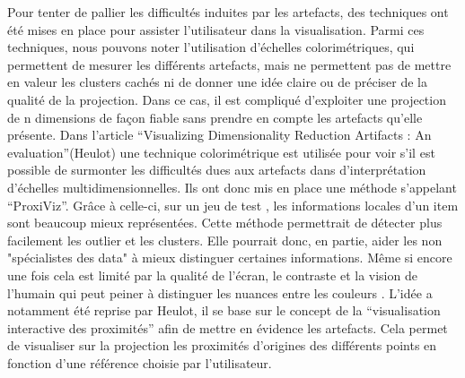 \smallskip
Pour tenter de pallier les difficultés induites par les artefacts, des techniques ont été mises en place pour assister l’utilisateur dans la visualisation. Parmi ces techniques, nous pouvons noter l’utilisation d’échelles colorimétriques\cite{CheckViz}, qui permettent de mesurer les différents artefacts, mais ne permettent pas de mettre en valeur les clusters cachés ni de donner une idée claire ou de préciser de la qualité de la projection. Dans ce cas, il est compliqué d’exploiter une projection de n dimensions de façon fiable sans prendre en compte les artefacts qu’elle présente\cite{aupetit2007visualizing}.    
Dans l’article “Visualizing Dimensionality Reduction Artifacts : An evaluation”(Heulot) une technique colorimétrique est utilisée pour voir s’il est possible de surmonter les difficultés dues aux artefacts dans d’interprétation d’échelles multidimensionnelles. Ils ont donc mis en place une méthode s'appelant “ProxiViz”. Grâce à celle-ci, sur un jeu de test , les informations locales d’un item sont beaucoup mieux représentées. Cette méthode permettrait de détecter plus facilement les outlier et les clusters. Elle pourrait donc, en partie, aider les non "spécialistes des data" à mieux distinguer certaines informations. Même si encore une fois cela est limité par la qualité de l’écran, le contraste et la vision de l'humain qui peut peiner à distinguer les nuances entre les couleurs\cite{HeulotAnEvaluation} \cite{tran2021approaching} \cite{deering1998human_vision}.
L’idée a notamment été reprise par Heulot\cite{HeulotThese}, il se base sur le concept de la “visualisation interactive des proximités'' afin de mettre en évidence les artefacts. Cela permet de visualiser sur la projection les proximités d’origines des différents points en fonction d’une référence choisie par l’utilisateur.


\medskip











